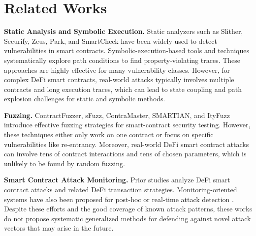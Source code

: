 \section{Related Works}




\noindent \textbf{Static Analysis and Symbolic Execution.}
Static analyzers such as Slither, Securify, Zeus, Park, and 
SmartCheck\cite{feist2019slither,tsankov2018securify,
kalra2018zeus,zheng2022park,tikhomirov2018smartcheck}
have been widely used to detect vulnerabilities in smart contracts.
Symbolic-execution-based tools and 
techniques\cite{king1976symbolic,mythril,luu2016making,liu2020towards,
frank2020ethbmc,feng2019precise,mossberg2019manticore}
systematically explore path conditions to find property-violating traces.
These approaches are highly effective for many vulnerability classes. 
However, for complex DeFi smart contracts, real-world attacks typically 
involves multiple contracts and long execution traces, 
which can lead to state coupling and path explosion 
challenges for static and symbolic methods.

\noindent \textbf{Fuzzing.}
ContractFuzzer, sFuzz, ContraMaster, SMARTIAN, 
and ItyFuzz\cite{jiang2018contractfuzzer,nguyen2020sfuzz,wang2020oracle,
choi2021smartian,shou2023ityfuzz}
introduce effective fuzzing strategies for smart-contract security testing.
However, these techniques either only work on one contract or focus
on specific vulnerabilities like re-entrancy. 
Moreover, real-world DeFi smart contract attacks can 
involve tens of contract interactions and tens of chosen parameters,
which is unlikely to be found by random fuzzing. 


\noindent \textbf{Smart Contract Attack Monitoring.}
Prior studies analyze DeFi smart contract attacks and related
 DeFi transaction strategies\cite{qin2021attacking,cao2021flashot,
 werapun2022flash,wang2021towards,gan2022understanding}.
Monitoring-oriented systems have also been proposed 
for post-hoc or real-time attack detection
\cite{xia2023detecting,ramezany2023midnight,wang2022defiscanner}.
Despite these efforts and the good coverage of known attack patterns, 
these works do not propose systematic generalized methods for defending 
against novel attack vectors that may arise in the future. 




